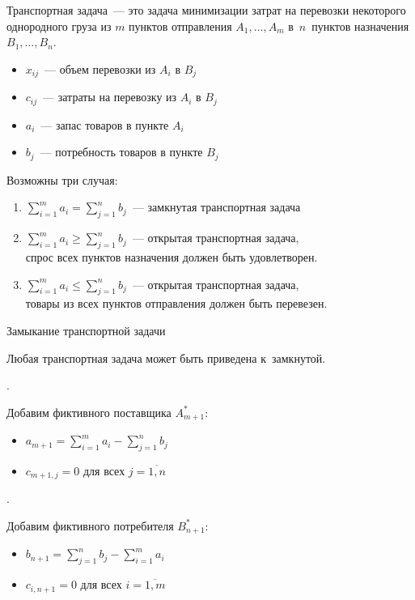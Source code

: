 \documentclass[unicode,11pt,notheorems,xcolor=table]{beamer}
\begin{document}
\begin{frame}{}{}
	
	\alert{Транспортная задача}~--- это задача минимизации затрат на перевозки некоторого однородного груза из $m$ пунктов отправления $A_1,\ldots, A_m$ в~$n$~пунктов назначения $B_1,\ldots, B_n$. 
	
	\begin{itemize}
		\item $x_{ij}$~--- объем перевозки из $A_i$ в $B_j$
		\item $c_{ij}$~--- затраты на перевозку из $A_i$ в $B_j$
		\item $a_{i}$~--- запас товаров в пункте $A_i$
		\item $b_{j}$~--- потребность товаров в пункте $B_j$
	\end{itemize}
	
	Возможны три случая:
	\begin{enumerate}
		\item $\sum_{i=1}^{m} a_{i}= \sum_{j=1}^{n} b_j$~--- \alert{замкнутая} транспортная задача
		\item $\sum_{i=1}^{m} a_{i} \geqslant \sum_{j=1}^{n} b_j$~--- \alert{открытая} транспортная задача,\\ спрос всех пунктов назначения должен быть удовлетворен.
		\item $\sum_{i=1}^{m} a_{i} \leqslant \sum_{j=1}^{n} b_j$~--- \alert{открытая} транспортная задача,\\ товары из всех пунктов отправления должен быть перевезен.
	\end{enumerate}
\end{frame}

\begin{frame}{Замыкание транспортной задачи}{}
	\begin{block}{}
		Любая транспортная задача может быть приведена к~замкнутой.
	\end{block}
	
	\bigskip
	
	.
	
	Добавим фиктивного поставщика $A^*_{m+1}$:
	\begin{itemize}
		\item  
		$a_{m+1} = \sum_{i=1}^{m} a_{i} - \sum_{j=1}^{n} b_j$
		\item  
		$c_{m+1,j} = 0$ для всех $j=\overline{1,n}$
	\end{itemize}
	
	\bigskip
	
	.
	
	Добавим фиктивного потребителя  $B^*_{n+1}$:
	\begin{itemize}
		\item  
		$b_{n+1} = \sum_{j=1}^{n} b_j - \sum_{i=1}^{m} a_{i}$
		\item  
		$c_{i,n+1} = 0$ для всех $i=\overline{1,m}$
	\end{itemize}
	
\end{frame}
\end{document}

